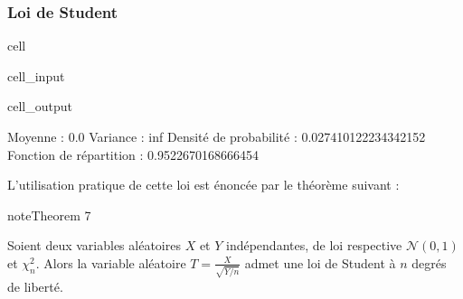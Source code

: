 \documentclass[letterpaper,10pt,french]{sphinxmanual}
\begin{document}
\subsubsection{Loi de Student}
\label{\detokenize{elemstats:loi-de-student}}
\begin{sphinxuseclass}{cell}
\begin{sphinxuseclass}{cell_input}
\begin{sphinxVerbatim}[commandchars=\\\{\}]
   
  
    
  
 
 
 
\end{sphinxVerbatim}

\end{sphinxuseclass}
\begin{sphinxuseclass}{cell_output}
\begin{sphinxVerbatim}[commandchars=\\\{\}]
Moyenne :  0.0
Variance :  inf
Densité de probabilité :  0.027410122234342152
Fonction de répartition :  0.9522670168666454
\end{sphinxVerbatim}

\end{sphinxuseclass}
\end{sphinxuseclass}
\sphinxAtStartPar
L’utilisation pratique de cette loi est énoncée par le théorème suivant :
\label{elemstats:theorem-13}
\begin{sphinxadmonition}{note}{Theorem 7}



\sphinxAtStartPar
Soient deux variables aléatoires \(X\) et \(Y\) indépendantes, de loi respective \(\mathcal{N}(0,1)\) et \(\chi_n^2\). Alors la variable aléatoire \(T=\frac{X}{\sqrt{Y/n}}\) admet une loi de Student à \(n\) degrés de liberté.
\end{sphinxadmonition}
\end{document}
